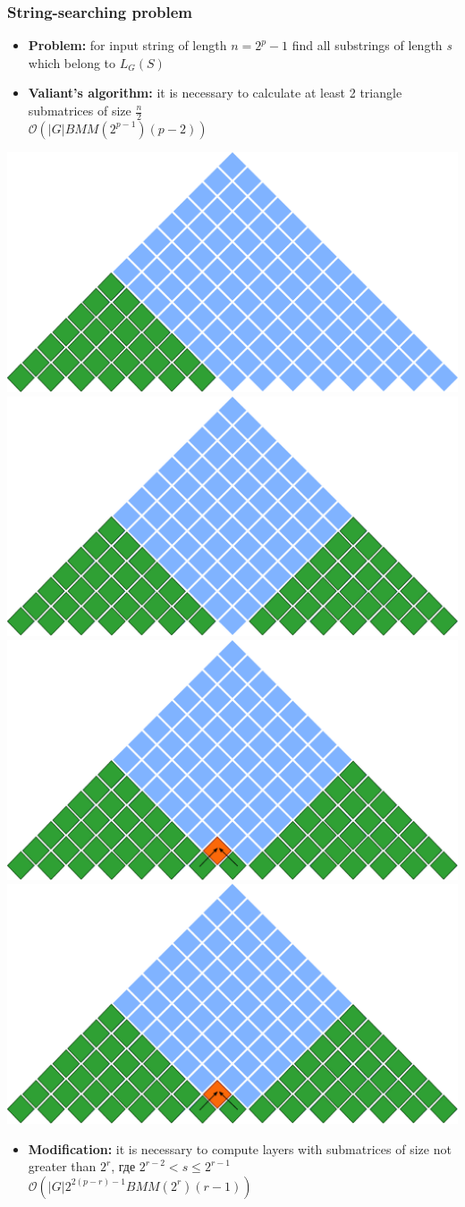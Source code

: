 \documentclass[xcolor=table]{beamer}
\begin{document}
\begin{frame}[fragile] \frametitle{String-searching problem}

    \begin{itemize}
      \item \textbf{Problem:} for input string of length $n = 2^p - 1$ find all substrings of length \textit{s} which belong to $L_G(S)$
      \item \textbf{Valiant's algorithm:} it is necessary to calculate at least 2 triangle submatrices of size $\frac{n}{2}$ \\ 
      $\mathcal{O}(|G|BMM(2^{p - 1})(p - 2))$
  \end{itemize}

    \begin{overprint}
        \centering\includegraphics[width = 0.5\linewidth]{pic/valsubstring1.pdf}
        \centering\includegraphics[width = 0.5\linewidth]{pic/valsubstring2.pdf}
        \centering\includegraphics[width = 0.5\linewidth]{pic/valsubstring3.pdf}
        \centering\includegraphics[width = 0.5\linewidth]{pic/valsubstring3.pdf}
    \end{overprint}

    \pause
    \begin{itemize}
      \item  \textbf{Modification:} it is necessary to compute layers with submatrices of size not greater than $2^r$, где $2^{r-2} < s \le 2^{r - 1}$ \\
      $\mathcal{O}(|G|2^{2(p - r) - 1}BMM(2^{r})(r - 1))$
  \end{itemize}

\end{frame}
\end{document}
